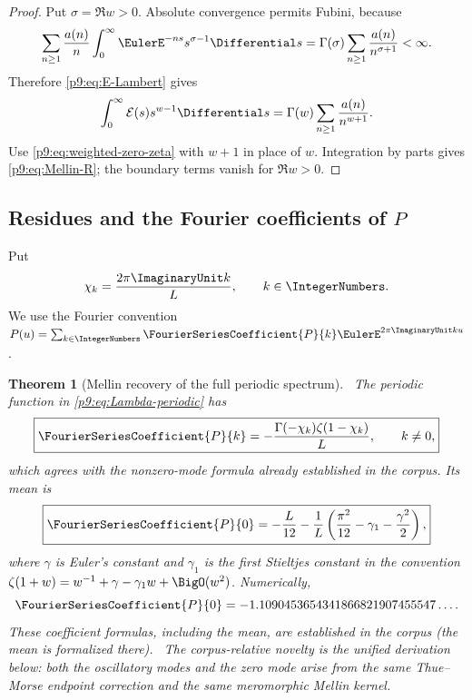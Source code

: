 \documentclass[11pt]{article}
\numberwithin{equation}{section}
\newtheorem{theorem}{Theorem}[section]
\theoremstyle{definition}
\theoremstyle{remark}
\begin{document}
\begin{proof}
Put $\sigma=\Re w>0$.  Absolute convergence permits Fubini, because
\[
 \sum_{n\ge1}\frac{a(n)}n
 \int_0^\infty\EulerE^{-ns}s^{\sigma-1}\Differential s
 =\Gamma(\sigma)\sum_{n\ge1}\frac{a(n)}{n^{\sigma+1}}<\infty.
\]
Therefore \eqref{p9:eq:E-Lambert} gives
\[
 \int_0^\infty\mathcal E(s)s^{w-1}\Differential s
 =\Gamma(w)\sum_{n\ge1}\frac{a(n)}{n^{w+1}}.
\]
Use \eqref{p9:eq:weighted-zero-zeta} with $w+1$ in place of $w$.  Integration by parts gives
\eqref{p9:eq:Mellin-R}; the boundary terms vanish for $\Re w>0$.
\end{proof}

\subsection{Residues and the Fourier coefficients of $P$}
Put
\begin{equation}
 \chi_k=\frac{2\pi\ImaginaryUnit k}{L},\qquad k\in\IntegerNumbers.                 \label{p9:eq:chi}
\end{equation}
We use the Fourier convention
$P(u)=\sum_{k\in\IntegerNumbers}\FourierSeriesCoefficient{P}{k}\EulerE^{2\pi\ImaginaryUnit ku}$.

\begin{theorem}[Mellin recovery of the full periodic spectrum]\label{p9:thm:P-Fourier}
\statusE\ The periodic function in \eqref{p9:eq:Lambda-periodic} has
\begin{equation}
 \boxed{
 \FourierSeriesCoefficient{P}{k}=-\frac{\Gamma(-\chi_k)\zeta(1-\chi_k)}L,
 \qquad k\ne0,}                                           \label{p9:eq:P-nonzero}
\end{equation}
which agrees with the nonzero-mode formula already established in the corpus.  Its mean is
\begin{equation}
 \boxed{
 \FourierSeriesCoefficient{P}{0}
 =-\frac L{12}
 -\frac1L\left(\frac{\pi^2}{12}-\gamma_1-\frac{\gamma^2}{2}\right),} \label{p9:eq:P-mean}
\end{equation}
where $\gamma$ is Euler's constant and $\gamma_1$ is the first Stieltjes constant in the
convention
$\zeta(1+w)=w^{-1}+\gamma-\gamma_1w+\BigO(w^2)$.
Numerically,
\begin{equation}
 \FourierSeriesCoefficient{P}{0}=-1.1090453654341866821907455547\ldots.       \label{p9:eq:P-mean-num}
\end{equation}
These coefficient formulas, including the mean, are established in the corpus (the mean is
formalized there).  \statusN\ The corpus-relative novelty is the unified derivation below:
both the oscillatory modes and the zero mode arise from the same Thue--Morse endpoint
correction and the same meromorphic Mellin kernel.
\end{theorem}
\end{document}
